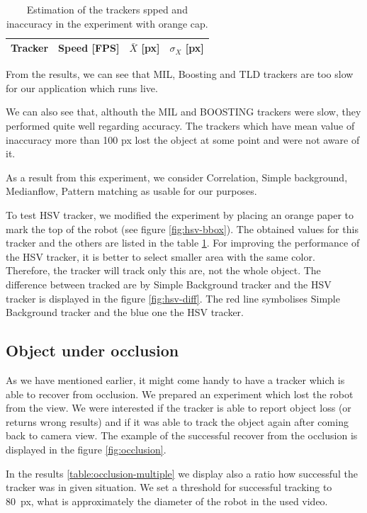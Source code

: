 \begin{table}
\centering
\begin{tabular}{l|r|r|r}
Tracker	& Speed [FPS] & $\bar{X}$ [px] & $\sigma_X$ [px] \\
\hline

\end{tabular}
\caption{Estimation of the trackers spped and inaccuracy in the experiment with orange cap.}
\label{table:hsv}
\end{table}

From the results, we can see that MIL, Boosting and TLD trackers are too slow
for our application which runs live.

We can also see that, althouth the MIL and BOOSTING trackers were slow, they
performed quite well regarding accuracy. The trackers which have mean value of
inaccuracy more than 100 px lost the object at some point and were not aware of
it.

As a result from this experiment, we consider Correlation, Simple background,
Medianflow, Pattern matching as usable for our purposes.

To test HSV tracker, we modified the experiment by placing an orange paper to
mark the top of the robot (see figure \ref{fig:hsv-bbox}). The obtained
values for this tracker and the others are listed in the table \ref{table:hsv}.
For improving the performance of the HSV tracker, it is better to select
smaller area with the same color. Therefore, the tracker will track only this
are, not the whole object. The difference between tracked are by Simple
Background tracker and the HSV tracker is displayed in the figure
\ref{fig:hsv-diff}. The red line symbolises Simple Background tracker and the
blue one the HSV tracker.

\subsection{Object under occlusion}

As we have mentioned earlier, it might come handy to have a tracker which is
able to recover from occlusion. We prepared an experiment which lost the
robot from the view. We were interested if the tracker is able to report object
loss (or returns wrong results) and if it was able to track the object again
after coming back to camera view. The example of the successful recover from
the occlusion is displayed in the figure \ref{fig:occlusion}.

In the results \ref{table:occlusion-multiple} we display also a ratio how
successful the tracker was in given situation. We set a threshold for
successful tracking to 80~px, what is approximately the diameter of the robot
in the used video.

